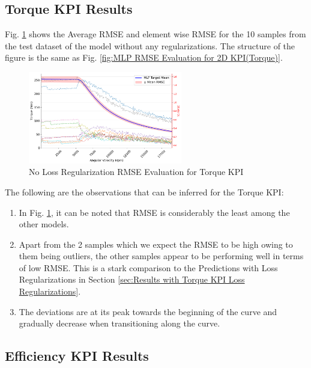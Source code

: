 \documentclass{report} %
\begin{document}
\subsection{Torque KPI Results}\label{subsec:Torque KPI Results with No Loss Regularization}

Fig. \ref{fig:No Loss Regularization RMSE Evaluation for 2D KPI(Torque)} shows the Average \ac{RMSE} and element wise \ac{RMSE} for the 10 samples from the test dataset 
of the model without any regularizations. The structure of the figure is the same as Fig. \ref{fig:MLP RMSE Evaluation for 2D KPI(Torque)}.\\

\begin{figure}[H]
    \centering
    \includegraphics[width=0.6\textwidth]{./ReportImages/RMSE_MLP_no_lossreg_y1.png} 
    \caption{No Loss Regularization \ac{RMSE} Evaluation for Torque \ac{KPI}} 
    \label{fig:No Loss Regularization RMSE Evaluation for 2D KPI(Torque)}
\end{figure}

The following are the observations that can be inferred for the Torque \ac{KPI}:
\begin{enumerate}[nosep]
    \item In Fig. \ref{fig:No Loss Regularization RMSE Evaluation for 2D KPI(Torque)}, it can be noted that \ac{RMSE} is considerably the least among the other models.
    \item Apart from the 2 samples which we expect the \ac{RMSE} to be high owing to them being outliers, the other samples appear to be performing well in terms 
    of low \ac{RMSE}. This is a stark comparison to the Predictions with Loss Regularizations in Section \ref{sec:Results with Torque KPI Loss Regularizations}.
    \item The deviations are at its peak towards the beginning of the curve and gradually decrease when transitioning along the curve.
\end{enumerate}

\subsection{Efficiency KPI Results}\label{subsec:Efficiency Results with No Loss Regularization}
\end{document}

